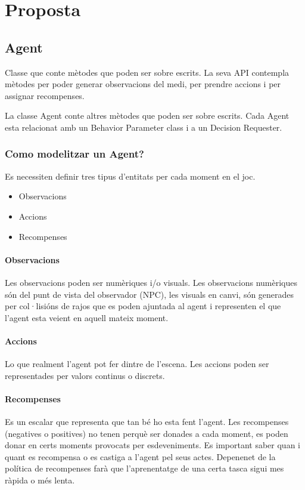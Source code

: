 \documentclass{article}
\begin{document}
    \newpage
    
    \section{Proposta}
    
    \subsection{Agent}
    Classe que conte mètodes que poden ser sobre escrits. La seva API contempla mètodes per poder generar observacions del medi, per prendre accions i per assignar recompenses.
    
    La classe Agent conte altres mètodes que poden ser sobre escrits. Cada Agent esta relacionat amb un Behavior Parameter class i a un Decision Requester.
    
    \subsubsection{Como modelitzar un Agent?}
    Es necessiten definir tres tipus d’entitats per cada moment en el joc.
    
    \begin{itemize}
        \item Observacions
        \item Accions
        \item Recompenses
    \end{itemize}
    
    \paragraph{Observacions}
    
    Les observacions poden ser numèriques i/o visuals. Les observacions numèriques són del punt de vista del observador (NPC), les visuals en canvi, són generades per col·lisións de rajos que es poden ajuntada al agent i representen el que l’agent esta veient en aquell mateix moment.
    
    \paragraph{Accions}
    
    Lo que realment l’agent pot fer dintre de l’escena. Les accions poden ser representades per valors continus o discrets.
    
    \paragraph{Recompenses}
    Es un escalar que representa que tan bé ho esta fent l’agent. Les recompenses (negatives o positives) no tenen perquè ser donades a cada moment, es poden donar en certs moments provocats per esdeveniments. Es important saber quan i quant es recompensa o es castiga a l’agent pel seus actes. Depenenet de la política de recompenses farà que l’aprenentatge de una certa tasca sigui mes ràpida o més lenta.
    
\end{document}
